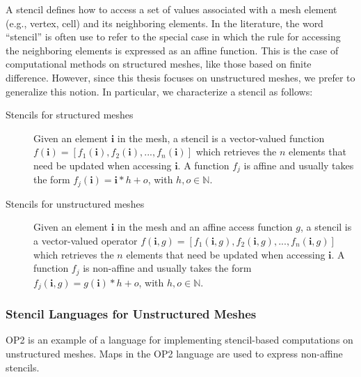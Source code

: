 A stencil defines how to access a set of values associated with a mesh element (e.g., vertex, cell) and its neighboring elements. In the literature, the word ``stencil'' is often use to refer to the special case in which the rule for accessing the neighboring elements is expressed as an affine function. This is the case of computational methods on structured meshes, like those based on finite difference. However, since this thesis focuses on unstructured meshes, we prefer to generalize this notion. In particular, we characterize a stencil as follows:

\begin{description}
\item[Stencils for structured meshes] Given an element $\boldsymbol{i}$ in the mesh, a stencil is a vector-valued function $f(\boldsymbol{i}) = [f_1(\boldsymbol{i}), f_2(\boldsymbol{i}), ..., f_n(\boldsymbol{i})]$ which retrieves the $n$ elements that need be updated when accessing $\boldsymbol{i}$. A function $f_j$ is affine and usually takes the form $f_j(\boldsymbol{i}) = \boldsymbol{i}*h + o$, with $h, o \in \mathbb{N}$.
\item[Stencils for unstructured meshes] Given an element $\boldsymbol{i}$ in the mesh and an affine access function $g$, a stencil is a vector-valued operator $f(\boldsymbol{i}, g) = [f_1(\boldsymbol{i}, g), f_2(\boldsymbol{i}, g), ..., f_n(\boldsymbol{i}, g)]$ which retrieves the $n$ elements that need be updated when accessing $\boldsymbol{i}$. A function $f_j$ is non-affine and usually takes the form $f_j(\boldsymbol{i}, g) = g(\boldsymbol{i})*h + o$, with $h, o \in \mathbb{N}$.
\end{description}

\subsubsection{Stencil Languages for Unstructured Meshes}
OP2 is an example of a language for implementing stencil-based computations on unstructured meshes. Maps in the OP2 language are used to express non-affine stencils. 

